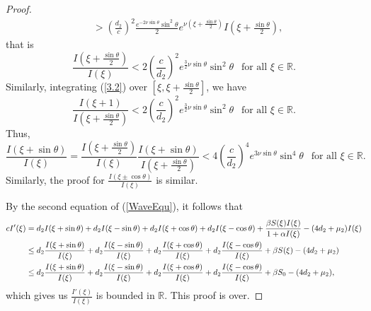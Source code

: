\documentclass[10pt,a4paper]{amsart}
\def\d {{\rm d}}
\begin{document}
\begin{proof}
\begin{align*}
 &>\left(\frac{d_2}{c}\right)^2\frac{e^{-2\nu\sin\theta}\sin^{2}\theta }{2}e^{\nu(\xi + \frac{\sin\theta}{2})}I\left(\xi + \frac{\sin\theta}{2}\right),
\end{align*}
that is
\[
\frac{I\left(\xi + \frac{\sin\theta}{2}\right)}{I(\xi)}<2\left(\frac{c}{d_2}\right)^2e^{\frac{3}{2}\nu\sin\theta}\sin^{2}\theta ~~\text{ for all } \xi \in \mathbb{R}.
\]
Similarly, integrating (\ref{3.2}) over \(\left[\xi, \xi + \frac{\sin\theta}{2}\right]\), we have
\[
\frac{I(\xi + 1)}{I\left(\xi + \frac{\sin\theta}{2}\right)}<2\left(\frac{c}{d_2}\right)^2e^{\frac{3}{2}\nu\sin\theta}\sin^{2}\theta~~ \text{ for all } \xi \in \mathbb{R}.
\]
Thus,
\[
\frac{I(\xi + \sin\theta)}{I(\xi)}=\frac{I\left(\xi + \frac{\sin\theta}{2}\right)}{I(\xi)}\frac{I(\xi + \sin\theta)}{I\left(\xi + \frac{\sin\theta}{2}\right)}<4\left(\frac{c}{d_2}\right)^4e^{3\nu\sin\theta}\sin^{4}\theta~~ \text{ for all } \xi \in \mathbb{R}.
\]
Similarly, the proof for $\displaystyle\frac{I(\xi \pm \cos\theta)}{I(\xi)}$ is similar.

By the second equation of (\ref{WaveEqu}), it follows that
\begin{align*}
cI'(\xi)&=d_{2}I(\xi + \sin\theta)+d_{2}I(\xi - \sin\theta)+d_{2}I(\xi + \cos\theta)+d_{2}I(\xi - \cos\theta)+\frac{\beta S(\xi){I(\xi)}}{1+\alpha I(\xi)}-(4d_2+\mu_2)I(\xi)\\
&\leq\d_{2}\frac{I(\xi + \sin\theta)}{I(\xi)}+d_{2}\frac{I(\xi - \sin\theta)}{I(\xi)}+d_{2}\frac{I(\xi + \cos\theta)}{I(\xi)}+d_{2}\frac{I(\xi - \cos\theta)}{I(\xi)}+\beta S(\xi)-(4d_2+\mu_2)\\
&\leq\d_{2}\frac{I(\xi + \sin\theta)}{I(\xi)}+d_{2}\frac{I(\xi - \sin\theta)}{I(\xi)}+d_{2}\frac{I(\xi + \cos\theta)}{I(\xi)}+d_{2}\frac{I(\xi - \cos\theta)}{I(\xi)}+\beta S_{0}-(4d_2+\mu_2),
\end{align*}
which gives us \(\displaystyle\frac{I'(\xi)}{I(\xi)}\) is bounded in \(\mathbb{R}\). This proof is over.
\end{proof}
\end{document}

